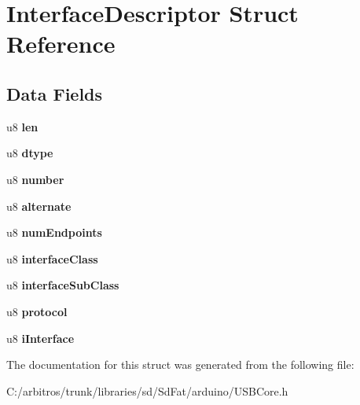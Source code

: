 \hypertarget{struct_interface_descriptor}{\section{Interface\-Descriptor Struct Reference}
\label{struct_interface_descriptor}
}
\subsection*{Data Fields}
\begin{DoxyCompactItemize}
\item 
\hypertarget{struct_interface_descriptor_afbf3f3230446569534d5f466aaf4c23b}{u8 {\bfseries len}}\label{struct_interface_descriptor_afbf3f3230446569534d5f466aaf4c23b}

\item 
\hypertarget{struct_interface_descriptor_a0bb419531ec75697e63e9109fecf81b0}{u8 {\bfseries dtype}}\label{struct_interface_descriptor_a0bb419531ec75697e63e9109fecf81b0}

\item 
\hypertarget{struct_interface_descriptor_a19a3a72d0e5c2ae75bee1ef63637c9e6}{u8 {\bfseries number}}\label{struct_interface_descriptor_a19a3a72d0e5c2ae75bee1ef63637c9e6}

\item 
\hypertarget{struct_interface_descriptor_a8b2cf5542b22d4c9ae79dfe6f7cd6d11}{u8 {\bfseries alternate}}\label{struct_interface_descriptor_a8b2cf5542b22d4c9ae79dfe6f7cd6d11}

\item 
\hypertarget{struct_interface_descriptor_afe8ecc909a70e40b9aaf4423fb495678}{u8 {\bfseries num\-Endpoints}}\label{struct_interface_descriptor_afe8ecc909a70e40b9aaf4423fb495678}

\item 
\hypertarget{struct_interface_descriptor_ac54ccb285d7fbe7c6516d4ca1a46d51c}{u8 {\bfseries interface\-Class}}\label{struct_interface_descriptor_ac54ccb285d7fbe7c6516d4ca1a46d51c}

\item 
\hypertarget{struct_interface_descriptor_a9f321d6e124ddf0beadced607fb9208a}{u8 {\bfseries interface\-Sub\-Class}}\label{struct_interface_descriptor_a9f321d6e124ddf0beadced607fb9208a}

\item 
\hypertarget{struct_interface_descriptor_a7354e97cb32f39427d6195c914ee2abd}{u8 {\bfseries protocol}}\label{struct_interface_descriptor_a7354e97cb32f39427d6195c914ee2abd}

\item 
\hypertarget{struct_interface_descriptor_a08ba0e1160648c2e45d24d1f00484466}{u8 {\bfseries i\-Interface}}\label{struct_interface_descriptor_a08ba0e1160648c2e45d24d1f00484466}

\end{DoxyCompactItemize}


The documentation for this struct was generated from the following file\-:\begin{DoxyCompactItemize}
\item 
C\-:/arbitros/trunk/libraries/sd/\-Sd\-Fat/arduino/U\-S\-B\-Core.\-h\end{DoxyCompactItemize}
